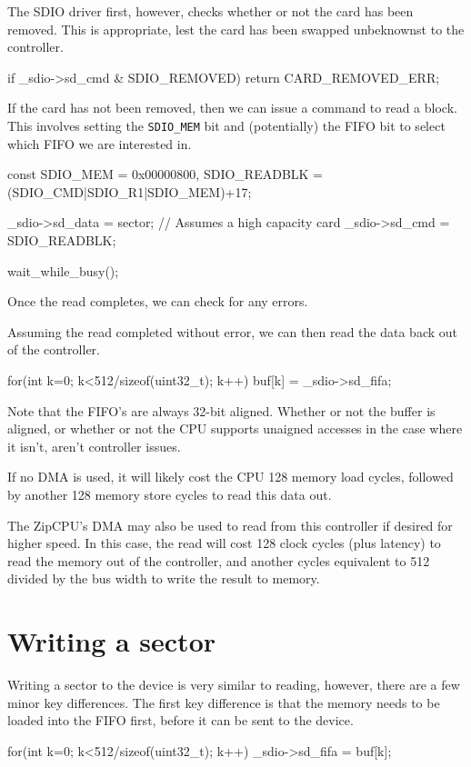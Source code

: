 \documentclass{gqtekspec}
\begin{document}
The SDIO driver first, however, checks whether or not the card has been
removed.  This is appropriate, lest the card has been swapped unbeknownst
to the controller.
\begin{zCpp}
	if _sdio->sd_cmd & SDIO_REMOVED)
		return CARD_REMOVED_ERR;
\end{zCpp}

If the card has not been removed, then we can issue a command to read a
block.  This involves setting the {\tt SDIO\_MEM} bit and (potentially) the
FIFO bit to select which FIFO we are interested in.
\begin{zCpp}
	const	SDIO_MEM     = 0x00000800,
		SDIO_READBLK = (SDIO_CMD|SDIO_R1|SDIO_MEM)+17;

	_sdio->sd_data = sector;	// Assumes a high capacity card
	_sdio->sd_cmd = SDIO_READBLK;

	wait_while_busy();
\end{zCpp}

Once the read completes, we can check for any errors.

Assuming the read completed without error, we can then read the data back
out of the controller.

\begin{zCpp}
	for(int k=0; k<512/sizeof(uint32_t); k++)
		buf[k] = _sdio->sd_fifa;
\end{zCpp}

Note that the FIFO's are always 32-bit aligned.  Whether or not the buffer
is aligned, or whether or not the CPU supports unaigned accesses in the
case where it isn't, aren't controller issues.

If no DMA is used, it will likely cost the CPU 128 memory load cycles, followed
by another 128 memory store cycles to read this data out.

The ZipCPU's DMA may also be used to read from this controller if desired
for higher speed.  In this case, the read will cost 128 clock cycles (plus
latency) to read the memory out of the controller, and another cycles
equivalent to 512 divided by the bus width to write the result to memory.
\section{Writing a sector}
Writing a sector to the device is very similar to reading, however, there
are a few minor key differences.  The first key difference is that the memory
needs to be loaded into the FIFO first, before it can be sent to the device.
\begin{zCpp}
	for(int k=0; k<512/sizeof(uint32_t); k++)
		_sdio->sd_fifa = buf[k];
\end{zCpp}
\end{document}
